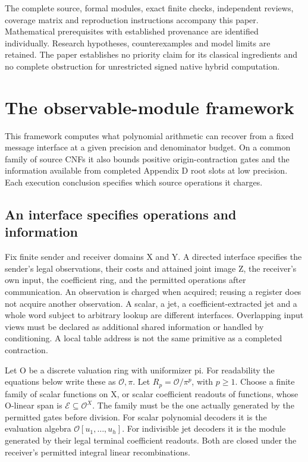 \documentclass[11pt,a4paper]{article}
\begin{document}
The complete source, formal modules, exact finite checks, independent
reviews, coverage matrix and reproduction instructions accompany this
paper. Mathematical prerequisites with established provenance are
identified individually. Research hypotheses, counterexamples and model
limits are retained. The paper establishes no priority claim for its
classical ingredients and no complete obstruction for unrestricted
signed native hybrid computation.

\section{The observable-module framework}\label{v8-section-framework}

This framework computes what polynomial arithmetic can recover from a
fixed message interface at a given precision and denominator budget. On
a common family of source CNFs it also bounds positive
origin-contraction gates and the information available from completed
Appendix D root slots at low precision. Each execution conclusion
specifies which source operations it charges.

\subsection{An interface specifies operations and
information}\label{v8-an-interface-specifies-operations-and-information}

Fix finite sender and receiver domains X and Y. A directed interface
specifies the sender's legal observations, their costs and attained
joint image Z, the receiver's own input, the coefficient ring, and the
permitted operations after communication. An observation is charged when
acquired; reusing a register does not acquire another observation. A
scalar, a jet, a coefficient-extracted jet and a whole word subject to
arbitrary lookup are different interfaces. Overlapping input views must
be declared as additional shared information or handled by conditioning.
A local table address is not the same primitive as a completed
contraction.

Let O be a discrete valuation ring with uniformizer pi. For readability
the equations below write these as \(\mathcal O,\pi\). Let
\(R_p=\mathcal O/\pi^p\), with \(p\ge1\). Choose a finite family of
scalar functions on X, or scalar coefficient readouts of functions,
whose O-linear span is \(\mathcal E\subseteq\mathcal O^X\). The family
must be the one actually generated by the permitted gates before
division. For scalar polynomial decoders it is the evaluation algebra
\(\mathcal O[u_1,\ldots,u_h]\). For indivisible jet decoders it is the
module generated by their legal terminal coefficient readouts. Both are
closed under the receiver's permitted integral linear recombinations.
\end{document}
